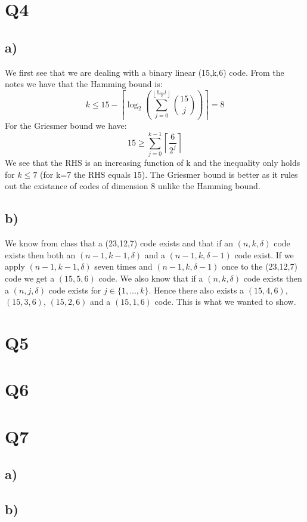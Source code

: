 \documentclass{article}
\begin{document}
\section*{Q4}
\subsection*{a)}
We first see that we are dealing with a binary linear (15,k,6) code. From the notes we have that the Hamming bound is:
$$k\leq 15-\left\lceil\log_2\left(\sum_{j=0}^{\left\lfloor\frac{6-1}{2}\right\rfloor}{15\choose j}\right)\right\rceil=8$$
For the Griesmer bound we have:
$$15\geq \sum_{j=0}^{k-1}\left\lceil\frac{6}{2^j}\right\rceil$$
We see that the RHS is an increasing function of k and the inequality only holds for $k\leq7$ (for k=7 the RHS equals 15). The Griesmer bound is better as it rules out the existance of codes of dimension 8 unlike the Hamming bound.
\subsection*{b)}
We know from class that a (23,12,7) code exists and that if an $(n,k,\delta)$ code exists then both an $(n-1,k-1,\delta)$ and a $(n-1,k,\delta-1)$ code exist. If we apply $(n-1,k-1,\delta)$ seven times and $(n-1,k,\delta-1)$ once to the (23,12,7) code we get a $(15,5,6)$ code. We also know that if a $(n,k,\delta)$ code exists then a $(n,j,\delta)$ code exists for $j\in\{1,...,k\}$. Hence there also exists a $(15,4,6)$, $(15,3,6)$, $(15,2,6)$ and a $(15,1,6)$ code. This is what we wanted to show.
\section*{Q5}
\section*{Q6}
\section*{Q7}
\subsection*{a)}
\subsection*{b)}
\end{document}

